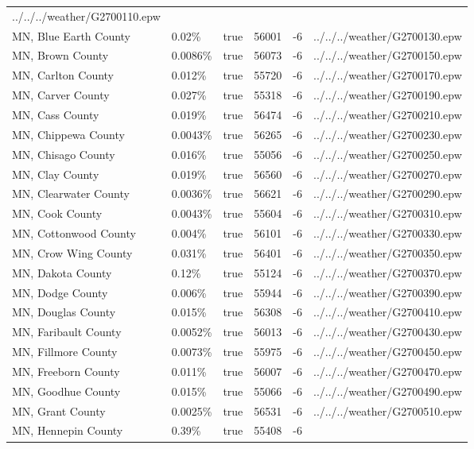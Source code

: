 \begin{longtable}[]{@{}llllll@{}}
../../../weather/G2700110.epw \\
MN, Blue Earth County & 0.02\% & true & 56001 & -6 &
../../../weather/G2700130.epw \\
MN, Brown County & 0.0086\% & true & 56073 & -6 &
../../../weather/G2700150.epw \\
MN, Carlton County & 0.012\% & true & 55720 & -6 &
../../../weather/G2700170.epw \\
MN, Carver County & 0.027\% & true & 55318 & -6 &
../../../weather/G2700190.epw \\
MN, Cass County & 0.019\% & true & 56474 & -6 &
../../../weather/G2700210.epw \\
MN, Chippewa County & 0.0043\% & true & 56265 & -6 &
../../../weather/G2700230.epw \\
MN, Chisago County & 0.016\% & true & 55056 & -6 &
../../../weather/G2700250.epw \\
MN, Clay County & 0.019\% & true & 56560 & -6 &
../../../weather/G2700270.epw \\
MN, Clearwater County & 0.0036\% & true & 56621 & -6 &
../../../weather/G2700290.epw \\
MN, Cook County & 0.0043\% & true & 55604 & -6 &
../../../weather/G2700310.epw \\
MN, Cottonwood County & 0.004\% & true & 56101 & -6 &
../../../weather/G2700330.epw \\
MN, Crow Wing County & 0.031\% & true & 56401 & -6 &
../../../weather/G2700350.epw \\
MN, Dakota County & 0.12\% & true & 55124 & -6 &
../../../weather/G2700370.epw \\
MN, Dodge County & 0.006\% & true & 55944 & -6 &
../../../weather/G2700390.epw \\
MN, Douglas County & 0.015\% & true & 56308 & -6 &
../../../weather/G2700410.epw \\
MN, Faribault County & 0.0052\% & true & 56013 & -6 &
../../../weather/G2700430.epw \\
MN, Fillmore County & 0.0073\% & true & 55975 & -6 &
../../../weather/G2700450.epw \\
MN, Freeborn County & 0.011\% & true & 56007 & -6 &
../../../weather/G2700470.epw \\
MN, Goodhue County & 0.015\% & true & 55066 & -6 &
../../../weather/G2700490.epw \\
MN, Grant County & 0.0025\% & true & 56531 & -6 &
../../../weather/G2700510.epw \\
MN, Hennepin County & 0.39\% & true & 55408 & -6 &

\end{longtable}
